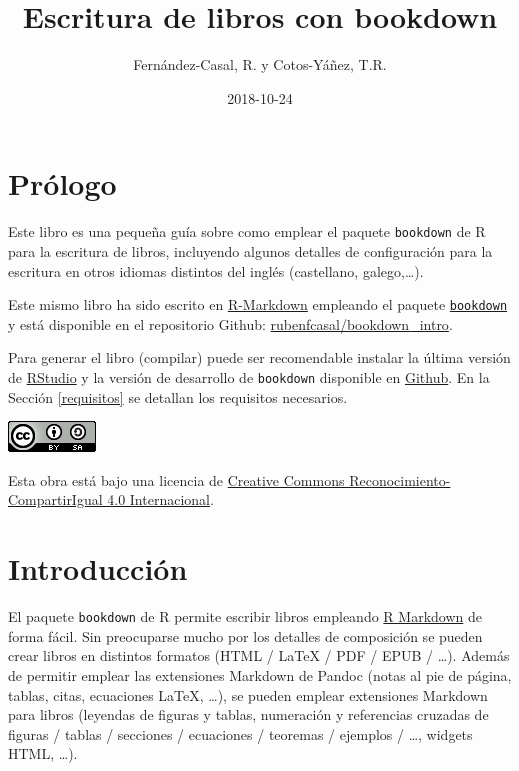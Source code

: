 \documentclass[]{book}
\title{Escritura de libros con bookdown}
\author{Fernández-Casal, R. y Cotos-Yáñez, T.R.}
\date{2018-10-24}
\theoremstyle{definition}
\theoremstyle{definition}
\theoremstyle{definition}
\theoremstyle{remark}
\begin{document}
\maketitle

{
\setcounter{tocdepth}{1}
\tableofcontents
}
\chapter*{Prólogo}\label{prologo}

Este libro es una pequeña guía sobre como emplear el paquete
\texttt{bookdown} de R para la escritura de libros, incluyendo algunos
detalles de configuración para la escritura en otros idiomas distintos
del inglés (castellano, galego,\ldots{}).

Este mismo libro ha sido escrito en
\href{http://rmarkdown.rstudio.com}{R-Markdown} empleando el paquete
\href{https://bookdown.org/yihui/bookdown/}{\texttt{bookdown}} y está
disponible en el repositorio Github:
\href{https://github.com/rubenfcasal/bookdown_intro}{rubenfcasal/bookdown\_intro}.

Para generar el libro (compilar) puede ser recomendable instalar la
última versión de
\href{(https://www.rstudio.com/products/rstudio/download/)}{RStudio} y
la versión de desarrollo de \texttt{bookdown} disponible en
\href{https://github.com/rstudio/bookdown}{Github}. En la Sección
\ref{requisitos} se detallan los requisitos necesarios.

\begin{flushleft}\includegraphics{images/by-sa-88x31} \end{flushleft}

Esta obra está bajo una licencia de
\href{https://creativecommons.org/licenses/by-sa/4.0/deed.es}{Creative
Commons Reconocimiento-CompartirIgual 4.0 Internacional}.

\chapter{Introducción}\label{intro}

El paquete \texttt{bookdown} \citep{R-bookdown} de R \citep{R-base}
permite escribir libros empleando \href{http://rmarkdown.rstudio.com}{R
Markdown} de forma fácil. Sin preocuparse mucho por los detalles de
composición se pueden crear libros en distintos formatos (HTML / LaTeX /
PDF / EPUB / \ldots{}). Además de permitir emplear las extensiones
Markdown de Pandoc (notas al pie de página, tablas, citas, ecuaciones
LaTeX, \ldots{}), se pueden emplear extensiones Markdown para libros
(leyendas de figuras y tablas, numeración y referencias cruzadas de
figuras / tablas / secciones / ecuaciones / teoremas / ejemplos /
\ldots{}, widgets HTML, \ldots{}).
\end{document}
